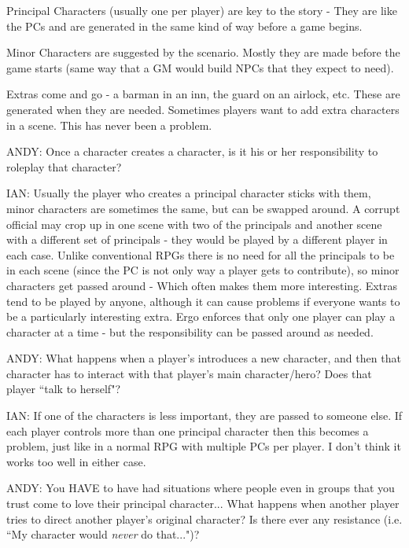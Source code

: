 \documentclass[twoside]{book}
\begin{document}
\begin{description}
Principal Characters (usually one per player) are key to the story - They are like the PCs and are generated in the same kind of way before a game begins.

Minor Characters are suggested by the scenario. Mostly they are made before the game starts (same way that a GM would build NPCs that they expect to need).

Extras come and go - a barman in an inn, the guard on an airlock, etc. These are generated when they are needed. Sometimes players want to add extra characters in a scene. This has never been a problem.

\item{ANDY:} Once a character creates a character, is it his or her responsibility to roleplay that character?

\item{IAN:} Usually the player who creates a principal character sticks with them, minor characters are sometimes the same, but can be swapped around. A corrupt official may crop up in one scene with two of the principals and another scene with a different set of principals - they would be played by a different player in each case. Unlike conventional RPGs there is no need for all the principals to be in each scene (since the PC is not only way a player gets to contribute), so minor characters get passed around - Which often makes them more interesting. Extras tend to be played by anyone, although it can cause problems if everyone wants to be a particularly interesting extra. Ergo enforces that only one player can play a character at a time - but the responsibility can be passed around as needed.

\item{ANDY:} What happens when a player's introduces a new character, and then that character has to interact with that player's main character/hero? Does that player ``talk to herself"?

\item{IAN:} If one of the characters is less important, they are passed to someone else. If each player controls more than one principal character then this becomes a problem, just like in a normal RPG with multiple PCs per player. I don't think it works too well in either case.

\item{ANDY:} You HAVE to have had situations where people even in groups that you trust come to love their principal character... What happens when another player tries to direct another player's original character? Is there ever any resistance (i.e. ``My character would {\it never} do that...")?


\end{description}
\end{document}
